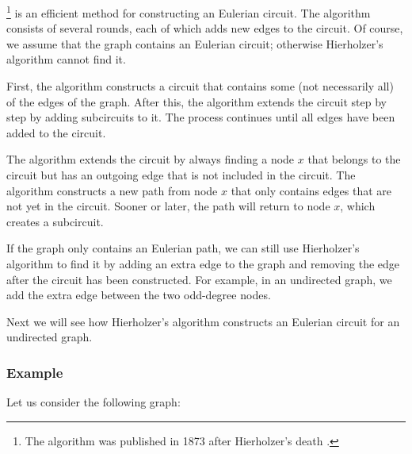 \footnote{The algorithm was published
in 1873 after Hierholzer's death \cite{hie73}.} is an efficient
method for constructing
an Eulerian circuit.
The algorithm consists of several rounds,
each of which adds new edges to the circuit.
Of course, we assume that the graph contains
an Eulerian circuit; otherwise Hierholzer's
algorithm cannot find it.

First, the algorithm constructs a circuit that contains
some (not necessarily all) of the edges of the graph.
After this, the algorithm extends the circuit
step by step by adding subcircuits to it.
The process continues until all edges have been added
to the circuit.

The algorithm extends the circuit by always finding
a node $x$ that belongs to the circuit but has
an outgoing edge that is not included in the circuit.
The algorithm constructs a new path from node $x$
that only contains edges that are not yet in the circuit.
Sooner or later,
the path will return to node $x$,
which creates a subcircuit.

If the graph only contains an Eulerian path,
we can still use Hierholzer's algorithm
to find it by adding an extra edge to the graph
and removing the edge after the circuit
has been constructed.
For example, in an undirected graph,
we add the extra edge between the two
odd-degree nodes.

Next we will see how Hierholzer's algorithm
constructs an Eulerian circuit for an undirected graph.

\subsubsection{Example}

\begin{samepage}
Let us consider the following graph:
\begin{center}
\end{center}
\end{samepage}

